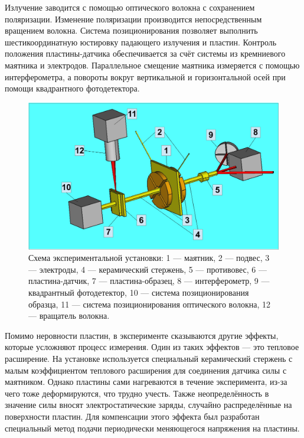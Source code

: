 Излучение заводится с помощью оптического волокна с сохранением поляризации. Изменение поляризации производится непосредственным вращением волокна. Система позиционирования позволяет выполнить шестикоординатную юстировку падающего излучения и пластин. Контроль положения пластины-датчика обеспечивается за счёт системы из кремниевого маятника и электродов. Параллельное смещение маятника измеряется с помощью интерферометра, а повороты вокруг вертикальной и горизонтальной осей при помощи квадрантного фотодетектора.
\begin{figure}
    \centering
    \includegraphics[width=\textwidth]{figures/exp2.pdf}
    \caption{Схема экспериментальной установки: 1 --- маятник, 2 --- подвес, 3 --- электроды,  4 --- керамический стержень, 5 --- противовес, 6 --- пластина-датчик, 7 --- пластина-образец, 8 --- интерферометр, 9 --- квадрантный фотодетектор, 10 --- система позиционирования образца, 11 --- система позиционирования оптического волокна, 12 --- вращатель волокна.}
    \label{fig:exp_set_up}
\end{figure}

Помимо неровности пластин, в эксперименте сказываются другие эффекты, которые усложняют процесс измерения. Один из таких эффектов --- это тепловое расширение. На установке используется специальный керамический стержень с малым коэффициентом теплового расширения для соединения датчика силы с маятником. Однако пластины сами нагреваются в течение эксперимента, из-за чего тоже деформируются, что трудно учесть. Также неопределённость в значение силы вносят электростатические заряды, случайно распределённые на поверхности пластин. Для компенсации этого эффекта был разработан специальный метод подачи периодически меняющегося напряжения на пластины.

